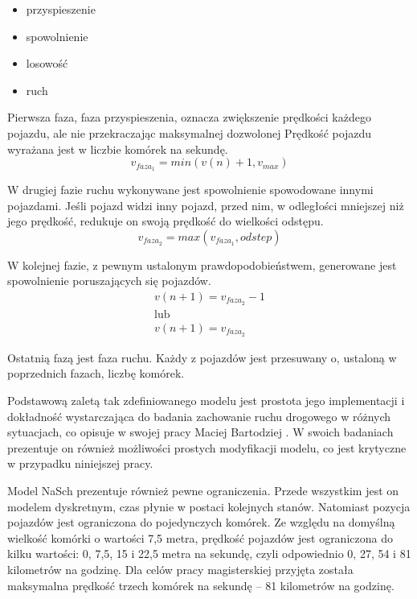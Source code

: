 \begin{itemize}
	\item przyspieszenie
	\item spowolnienie
	\item losowość
	\item ruch
\end{itemize}

Pierwsza faza, faza przyspieszenia, oznacza zwiększenie prędkości każdego pojazdu, ale nie przekraczając maksymalnej dozwolonej
Prędkość pojazdu wyrażana jest w liczbie komórek na sekundę.
\begin {equation}
	v_{faza_1} = min (v(n) + 1, v_{max})
\end {equation}

W drugiej fazie ruchu wykonywane jest spowolnienie spowodowane innymi pojazdami. Jeśli pojazd widzi inny pojazd, przed nim, w odległości mniejszej niż jego prędkość, redukuje on swoją prędkość do wielkości odstępu.
\begin {equation}
	v_{faza_2} = max (v_{faza_1}, odstep)
\end{equation}

W kolejnej fazie, z pewnym ustalonym prawdopodobieństwem, generowane jest spowolnienie poruszających się pojazdów.
\begin {equation}
	\begin{array} {c}
		v(n+1) = v_{faza_2} - 1\\
		\textrm{lub}\\
		v(n+1) = v_{faza_2}
	\end{array}
\end{equation}

Ostatnią fazą jest faza ruchu. Każdy z pojazdów jest przesuwany o, ustaloną w poprzednich fazach, liczbę komórek.

Podstawową zaletą tak zdefiniowanego modelu jest prostota jego implementacji i dokładność wystarczająca do badania zachowanie ruchu drogowego w różnych sytuacjach, co opisuje w swojej pracy Maciej Bartodziej \cite{bartodziej}. W swoich badaniach prezentuje on również możliwości prostych modyfikacji modelu, co jest krytyczne w przypadku niniejszej pracy.

Model NaSch prezentuje również pewne ograniczenia. Przede wszystkim jest on modelem dyskretnym, czas płynie w postaci kolejnych stanów. Natomiast pozycja pojazdów jest ograniczona do pojedynczych komórek. Ze względu na domyślną wielkość komórki o wartości 7,5 metra, prędkość pojazdów jest ograniczona do kilku wartości: 0, 7,5, 15 i 22,5 metra na sekundę, czyli odpowiednio 0, 27, 54 i 81 kilometrów na godzinę. Dla celów pracy magisterskiej przyjęta została maksymalna prędkość trzech komórek na sekundę -- 81 kilometrów na godzinę.

